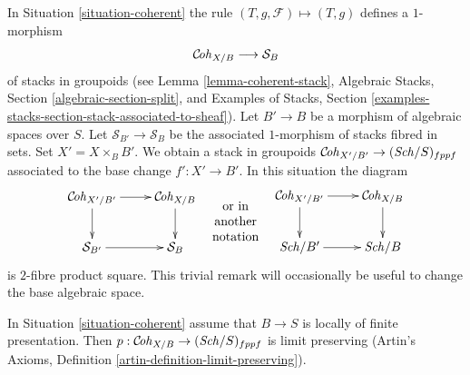 \begin{remark}
\label{remark-coherent-base-change}
In Situation \ref{situation-coherent} the rule
$(T, g, \mathcal{F}) \mapsto (T, g)$ defines a $1$-morphism
$$
\mathcal{C}\!\mathit{oh}_{X/B} \longrightarrow \mathcal{S}_B
$$
of stacks in groupoids
(see Lemma \ref{lemma-coherent-stack},
Algebraic Stacks, Section \ref{algebraic-section-split}, and
Examples of Stacks, Section
\ref{examples-stacks-section-stack-associated-to-sheaf}).
Let $B' \to B$ be a morphism of
algebraic spaces over $S$. Let $\mathcal{S}_{B'} \to \mathcal{S}_B$
be the associated $1$-morphism of stacks fibred in sets.
Set $X' = X \times_B B'$.
We obtain a stack in groupoids $\mathcal{C}\!\mathit{oh}_{X'/B'} \to (\mathit{Sch}/S)_{fppf}$
associated to the base change $f' : X' \to B'$. In this situation
the diagram
$$
\vcenter{
\xymatrix{
\Cohstack_{X'/B'} \ar[r] \ar[d] & \Cohstack_{X/B} \ar[d] \\
\mathcal{S}_{B'} \ar[r] & \mathcal{S}_B
}
}
\quad
\begin{matrix}
\text{or in} \\
\text{another} \\
\text{notation}
\end{matrix}
\quad
\vcenter{
\xymatrix{
\Cohstack_{X'/B'} \ar[r] \ar[d] & \Cohstack_{X/B} \ar[d] \\
\Sch/B' \ar[r] & \Sch/B
}
}
$$
is $2$-fibre product square. This trivial remark
will occasionally be useful to change the base algebraic space.
\end{remark}

\begin{lemma}
\label{lemma-coherent-limits}
In Situation \ref{situation-coherent} assume that $B \to S$
is locally of finite presentation. Then
$p : \mathcal{C}\!\mathit{oh}_{X/B} \to (\mathit{Sch}/S)_{fppf}$ is limit preserving
(Artin's Axioms, Definition \ref{artin-definition-limit-preserving}).
\end{lemma}

